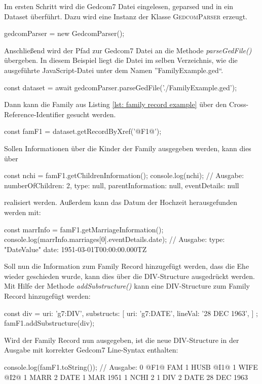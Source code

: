 \vspace{1em}
{
\noindent
Im ersten Schritt wird die Gedcom7 Datei eingelesen, geparsed und in ein Dataset überführt. Dazu wird eine Instanz der Klasse \textsc{GedcomParser} erzeugt.
\begin{javascriptNoCaption}
	gedcomParser = new GedcomParser();
\end{javascriptNoCaption}
Anschließend wird der Pfad zur Gedcom7 Datei an die Methode \textit{parseGedFile()} übergeben. In diesem Beispiel liegt die Datei im selben Verzeichnis, wie die ausgeführte JavaScript-Datei unter dem Namen ''FamilyExample.ged``. 
\begin{javascriptNoCaption}
	const dataset = await gedcomParser.parseGedFile('./FamilyExample.ged');
\end{javascriptNoCaption}
Dann kann die Family aus Listing \ref{lst: family record example} über den Cross-Reference-Identifier gesucht werden.
\begin{javascriptNoCaption}
	const famF1 = dataset.getRecordByXref('@F1@');
\end{javascriptNoCaption}
Sollen Informationen über die Kinder der Family ausgegeben werden, kann dies über 
\begin{javascriptNoCaption}
	const nchi = famF1.getChildrenInformation();
	console.log(nchi);
	// Ausgabe: 
	   {
		 numberOfChildren: 2,
		 type: null,
		 parentInformation: null,
		 eventDetails: null
	   }
\end{javascriptNoCaption}
realisiert werden. Außerdem kann das Datum der Hochzeit herausgefunden werden mit:
\begin{javascriptNoCaption}
	const marrInfo = famF1.getMarriageInformation();
	console.log(marrInfo.marriages[0].eventDetails.date);
	// Ausgabe: 
	   {
		 type: "DateValue"
		 date: 1951-03-01T00:00:00.000TZ
	   }
\end{javascriptNoCaption}
Soll nun die Information zum Family Record hinzugefügt werden, dass die Ehe wieder geschieden wurde, kann dies über die DIV-Structure ausgedrückt werden. Mit Hilfe der Methode \textit{addSubstructure()} kann eine DIV-Structure zum Family Record hinzugefügt werden:
\begin{javascriptNoCaption}
	const div = {
		uri: 'g7:DIV',
		substructs: [{
			uri: 'g7:DATE',
			lineVal: '28 DEC 1963',
		}]
	};
	famF1.addSubstructure(div);
\end{javascriptNoCaption}
Wird der Family Record nun ausgegeben, ist die neue DIV-Structure in der Ausgabe mit korrekter Gedcom7 Line-Syntax enthalten:
\begin{javascriptNoCaption}
	console.log(famF1.toString());
	// Ausgabe: 
	   0 @F1@ FAM
	   1 HUSB @I1@
	   1 WIFE @I2@
	   1 MARR
	   2 DATE 1 MAR 1951
	   1 NCHI 2
	   1 DIV
	   2 DATE 28 DEC 1963
\end{javascriptNoCaption}
}

